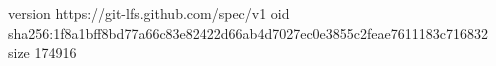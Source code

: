 version https://git-lfs.github.com/spec/v1
oid sha256:1f8a1bff8bd77a66c83e82422d66ab4d7027ec0e3855c2feae7611183c716832
size 174916
